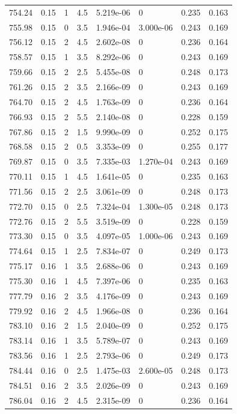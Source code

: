 \documentclass[preview]{standalone}
\begin{document}
{{{{{{{{{{{{{\begin{tabular}{L{1.2cm}C{1.2cm} C{0.3cm}C{0.5cm} C{1.4cm}C{1.4cm} C{1.4cm}C{1.4cm}}
  754.24  &  0.15  & 1     & 4.5 &  5.219e-06  & 0  & 0.235 &  0.163   \\ 
  755.98  &  0.15  & 0     & 3.5 &  1.946e-04  & 3.000e-06  & 0.243 &  0.169   \\ 
  756.12  &  0.15  & 2     & 4.5 &  2.602e-08  & 0  & 0.236 &  0.164   \\ 
  758.57  &  0.15  & 1     & 3.5 &  8.292e-06  & 0  & 0.243 &  0.169   \\ 
  759.66  &  0.15  & 2     & 2.5 &  5.455e-08  & 0  & 0.248 &  0.173   \\ 
  761.26  &  0.15  & 2     & 3.5 &  2.166e-09  & 0  & 0.243 &  0.169   \\ 
  764.70  &  0.15  & 2     & 4.5 &  1.763e-09  & 0  & 0.236 &  0.164   \\ 
  766.93  &  0.15  & 2     & 5.5 &  2.140e-08  & 0  & 0.228 &  0.159   \\ 
  767.86  &  0.15  & 2     & 1.5 &  9.990e-09  & 0  & 0.252 &  0.175   \\ 
  768.58  &  0.15  & 2     & 0.5 &  3.353e-09  & 0  & 0.255 &  0.177   \\ 
  769.87  &  0.15  & 0     & 3.5 &  7.335e-03  & 1.270e-04  & 0.243 &  0.169   \\ 
  770.11  &  0.15  & 1     & 4.5 &  1.641e-05  & 0  & 0.235 &  0.163   \\ 
  771.56  &  0.15  & 2     & 2.5 &  3.061e-09  & 0  & 0.248 &  0.173   \\ 
  772.70  &  0.15  & 0     & 2.5 &  7.324e-04  & 1.300e-05  & 0.248 &  0.173   \\ 
  772.76  &  0.15  & 2     & 5.5 &  3.519e-09  & 0  & 0.228 &  0.159   \\ 
  773.30  &  0.15  & 0     & 3.5 &  4.097e-05  & 1.000e-06  & 0.243 &  0.169   \\ 
  774.64  &  0.15  & 1     & 2.5 &  7.834e-07  & 0  & 0.249 &  0.173   \\ 
  775.17  &  0.16  & 1     & 3.5 &  2.688e-06  & 0  & 0.243 &  0.169   \\ 
  775.30  &  0.16  & 1     & 4.5 &  7.397e-06  & 0  & 0.235 &  0.163   \\ 
  777.79  &  0.16  & 2     & 3.5 &  4.176e-09  & 0  & 0.243 &  0.169   \\ 
  779.92  &  0.16  & 2     & 4.5 &  1.966e-08  & 0  & 0.236 &  0.164   \\ 
  783.10  &  0.16  & 2     & 1.5 &  2.040e-09  & 0  & 0.252 &  0.175   \\ 
  783.14  &  0.16  & 1     & 3.5 &  5.789e-07  & 0  & 0.243 &  0.169   \\ 
  783.56  &  0.16  & 1     & 2.5 &  2.793e-06  & 0  & 0.249 &  0.173   \\ 
  784.44  &  0.16  & 0     & 2.5 &  1.475e-03  & 2.600e-05  & 0.248 &  0.173   \\ 
  784.51  &  0.16  & 2     & 3.5 &  2.026e-09  & 0  & 0.243 &  0.169   \\ 
  786.04  &  0.16  & 2     & 4.5 &  2.315e-09  & 0  & 0.236 &  0.164   \\ 
\hline 
\end{tabular} 

}}}}}}}}}}}}}
\end{document}
